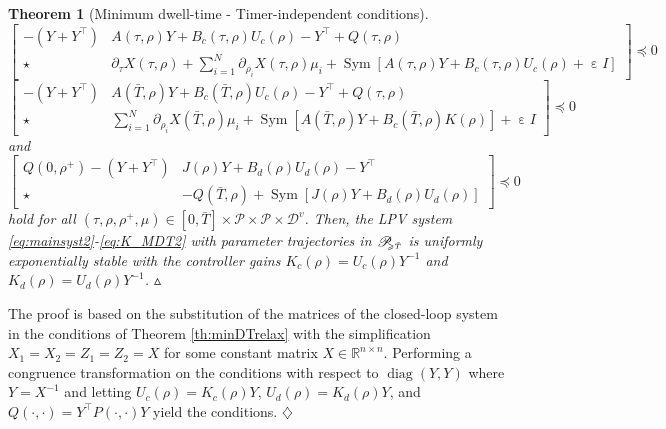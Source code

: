 \documentclass[12pt]{article}
\def\T{\textnormal{T}}
\newtheorem{theorem}{Theorem}%
\newcommand{\mendth}{\hfill \ensuremath{\vartriangle}}
\DeclareMathOperator{\He}{Sym}
\DeclareMathOperator*{\diag}{diag}
\DeclareMathOperator{\eps}{\varepsilon}
\newenvironment{proof}{{\it Proof :~}}{\hfill$\diamondsuit$\\}
\def\T{\intercal}
\begin{document}
{\begin{theorem}[Minimum dwell-time - Timer-independent conditions]
%
  \begin{equation}\label{eq:minDT:2relax:stabz}
       \begin{bmatrix}
         -(Y+Y^{\T}) & A(\tau,\rho)Y+B_c(\tau,\rho)U_c(\rho)-Y^{\T}+Q(\tau,\rho)\\
         \star & \partial_\tau X(\tau,\rho)+\sum_{i=1}^N\partial_{\rho_i} X(\tau,\rho)\mu_i+\He[A(\tau,\rho)Y+B_c(\tau,\rho)U_c(\rho)+\eps I]
       \end{bmatrix}\preceq0
    \end{equation}
     \begin{equation}\label{eq:minDT:1relax:stabz}
     \begin{bmatrix}
         -(Y+Y^{\T}) & A(\bar{T},\rho)Y+B_c(\bar{T},\rho)U_c(\rho)-Y^{\T}+Q(\tau,\rho)\\
         \star & \sum_{i=1}^N\partial_{\rho_i}X(\bar{T},\rho)\mu_i+\He[A(\bar{T},\rho)Y+B_c(\bar{T},\rho)K(\rho)]+\eps I
       \end{bmatrix}\preceq0
    \end{equation}
    and
     \begin{equation}\label{eq:minDT:3relax:stabz}
     \begin{bmatrix}
       Q(0,\rho^+)-(Y+Y^{\T}) & J(\rho)Y+B_d(\rho)U_d(\rho)-Y^{\T}\\
        \star & -Q(\bar{T},\rho)+\He[J(\rho)Y+B_d(\rho)U_d(\rho)]
     \end{bmatrix}\preceq0
       \end{equation}
    hold for all $(\tau,\rho,\rho^+,\mu)\in[0, \bar{T}]\times\mathcal{P}\times\mathcal{P}\times \mathcal{D}^v$.  Then, the LPV system \eqref{eq:mainsyst2}-\eqref{eq:K_MDT2} with parameter trajectories in $\mathscr{P}_{\hspace{-1mm}{\scriptscriptstyle\geqslant \bar{T}}}$ is uniformly exponentially stable with the controller gains $K_c(\rho)=U_c(\rho)Y^{-1}$ and $K_d(\rho)=U_d(\rho)Y^{-1}$.
\hfill\mendth
\end{theorem}
\begin{proof}
  The proof is based on the substitution of the matrices of the closed-loop system in the conditions of Theorem \ref{th:minDTrelax} with the simplification $X_1=X_2=Z_1=Z_2=X$  for some constant matrix $X\in\mathbb{R}^{n\times n}$. Performing a congruence transformation on the conditions with respect to $\diag(Y,Y)$ where $Y=X^{-1}$ and letting $U_c(\rho)=K_c(\rho)Y$, $U_d(\rho)=K_d(\rho)Y$, and $Q(\cdot,\cdot)=Y^{\T}P(\cdot,\cdot)Y$  yield the conditions.
\end{proof}

}
\end{document}
